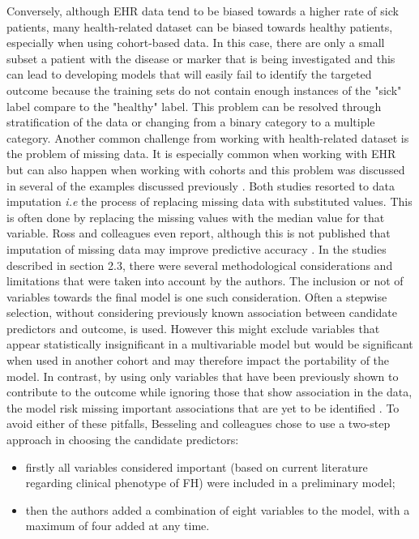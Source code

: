 Conversely, although EHR data tend to be biased towards a higher rate of sick patients, many health-related dataset can be biased towards healthy patients, especially when using cohort-based data. In this case, there are only a small subset a patient with the disease or marker that is being investigated and this can lead to developing models that will easily fail to identify the targeted outcome because the training sets do not contain enough instances of the "sick" label compare to the "healthy" label.
This problem can be resolved through stratification of the data or changing from a binary category to a multiple category.
Another common challenge from working with health-related dataset is the problem of missing data. It is especially common when working with EHR \citep{Goldstein:2017bk} but can also happen when working with cohorts and this problem was discussed in several of the examples discussed previously \citep{Besseling:2017bs, Ross:2016kh}.\newline
Both studies resorted to data imputation \textit{i.e} the process of replacing missing data with substituted values. This is often done by replacing the missing values with the median value for that variable. Ross and colleagues even report, although this is not published that imputation of missing data may improve predictive accuracy \citep{Ross:2016kh}.\newline
In the studies described in section 2.3, there were several methodological considerations and limitations that were taken into account by the authors. The inclusion or not of variables towards the final model is one such consideration. Often a stepwise selection, without considering previously known association between candidate predictors and outcome, is used. However this might exclude variables that appear statistically insignificant in a multivariable model but would be significant when used in another cohort and may therefore impact the portability of the model. In contrast, by using only variables that have been previously shown to contribute to the outcome while ignoring those that show association in the data, the model risk missing important associations that are yet to be identified \citep{Besseling:2017bs}. To avoid either of these pitfalls, Besseling and colleagues chose to use a two-step approach in choosing the candidate predictors: 
 \begin{itemize}
 \item firstly all variables considered important (based on current literature regarding clinical phenotype of FH) were included in a preliminary model;
 \item then the authors added a combination of eight variables to the model, with a maximum of four added at any time.
\end{itemize}
